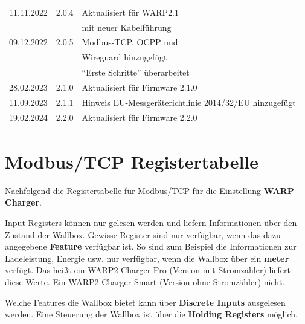\documentclass[a4paper,10pt]{article}
\begin{document}
\begin{multicols*}{2}
\begin{tabular}{lll}
        11.11.2022 & 2.0.4   & Aktualisiert für WARP2.1        \\
                   &         & mit neuer Kabelführung          \\
        09.12.2022 & 2.0.5   & Modbus-TCP, OCPP und            \\
                   &         & Wireguard hinzugefügt           \\
                   &         & \enquote{Erste Schritte} überarbeitet \\
        28.02.2023 & 2.1.0   & Aktualisiert für Firmware 2.1.0 \\
        11.09.2023 & 2.1.1   & Hinweis EU-Messgeräterichtlinie 2014/32/EU hinzugefügt\\
        19.02.2024 & 2.2.0   & Aktualisiert für Firmware 2.2.0 \\
        \bottomrule
    \end{tabular}

    \vfill
    \null

    \columnbreak
\appendix

\section{Modbus/TCP Registertabelle}
\label{modbus_tcp_registertabelle}
Nachfolgend die Registertabelle für Modbus/TCP für die Einstellung \textbf{WARP
Charger}.

Input Registers können nur gelesen werden und liefern Informationen über den
Zustand der Wallbox. Gewisse Register sind nur verfügbar, wenn das dazu
angegebene \textbf{Feature} verfügbar ist. So sind zum Beispiel die
Informationen zur Ladeleistung, Energie usw. nur verfügbar, wenn die Wallbox
über ein \textbf{meter} verfügt. Das heißt ein WARP2 Charger Pro (Version mit
Stromzähler) liefert diese Werte. Ein WARP2 Charger Smart (Version ohne
Stromzähler) nicht.

Welche Features die Wallbox bietet kann über \textbf{Discrete Inputs} ausgelesen
werden. Eine Steuerung der Wallbox ist über die \textbf{Holding Registers}
möglich.

\end{multicols*}
\end{document}
